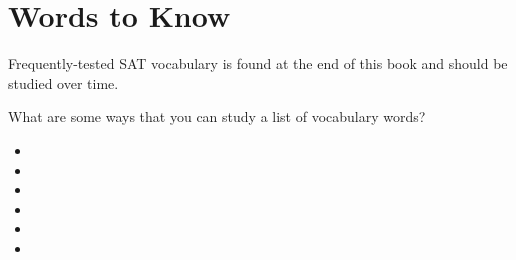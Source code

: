 \section{Words to Know}

Frequently-tested SAT vocabulary is found at the end of this book and should be studied over time.

What are some ways that you can study a list of vocabulary words?
\begin{itemize}
\item    

\item 

\item 
   
\item 

\item 

\item 

\end{itemize}
